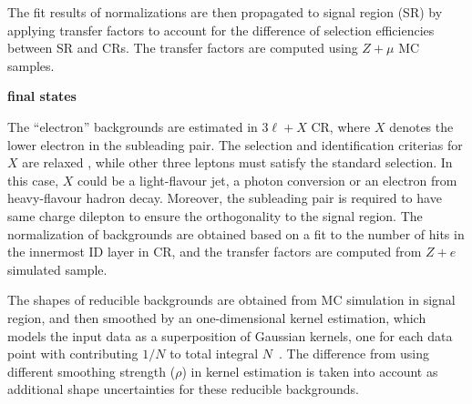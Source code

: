 The fit results of normalizations are then propagated to signal region (SR) by applying transfer factors to account for the difference of selection efficiencies between SR and CRs.
The transfer factors are computed using $Z+\mu$ MC samples.

\textbf{\llee final states} 

The ``electron'' backgrounds are estimated in $3\ell+X$ CR, where $X$ denotes the lower \pt electron in the subleading pair.
The selection and identification criterias for $X$ are relaxed , while other three leptons must satisfy the standard selection.
In this case, $X$ could be a light-flavour jet, a photon conversion or an electron from heavy-flavour hadron decay.
Moreover, the subleading pair is required to have same charge dilepton to ensure the orthogonality to the signal region.
The normalization of backgrounds are obtained based on a fit to the number of hits in the innermost ID layer in CR,
and the transfer factors are computed from $Z+e$ simulated sample.

The \mfl shapes of reducible backgrounds are obtained from MC simulation in signal region, and then smoothed by an one-dimensional kernel estimation,
which models the input data as a superposition of Gaussian kernels, one for each data point with contributing $1/N$ to total integral $N$~\cite{Cranmer:2000du}.
The difference from using different smoothing strength ($\rho$) in kernel estimation is taken into account as additional shape uncertainties for these reducible backgrounds.
